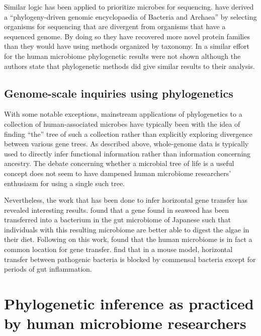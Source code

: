 \documentclass{amsart}
\begin{document}
Similar logic has been applied to prioritize microbes for sequencing.
\citet{wu2009phylogeny} have derived a ``phylogeny-driven genomic encyclopaedia of Bacteria and Archaea'' by selecting organisms for sequencing that are divergent from organisms that have a sequenced genome.
By doing so they have recovered more novel protein families than they would have using methods organized by taxonomy.
In a similar effort for the human microbiome \citep{fodor2012most} phylogenetic results were not shown although the authors state that phylogenetic methods did give similar results to their analysis.


\subsection{Genome-scale inquiries using phylogenetics}
With some notable exceptions, mainstream applications of phylogenetics to a collection of human-associated microbes have typically been with the idea of finding ``the'' tree of such a collection rather than explicitly exploring divergence between various gene trees.
As described above, whole-genome data is typically used to directly infer functional information rather than information concerning ancestry.
The debate concerning whether a microbial tree of life is a useful concept \citep{bapteste2009prokaryotic,caro2012bacterial} does not seem to have dampened human microbiome researchers' enthusiasm for using a single such tree.

Nevertheless, the work that has been done to infer horizontal gene transfer has revealed interesting results.
\citet{hehemann2010transfer} found that a gene found in seaweed has been transferred into a bacterium in the gut microbiome of Japanese such that individuals with this resulting microbiome are better able to digest the algae in their diet.
Following on this work, \citet{smillie2011ecology} found that the human microbiome is in fact a common location for gene transfer.
\citet{stecher2012gut} find that in a mouse model, horizontal transfer between pathogenic bacteria is blocked by commensal bacteria except for periods of gut inflammation.


\section{Phylogenetic inference as practiced by human microbiome researchers}
\end{document}
